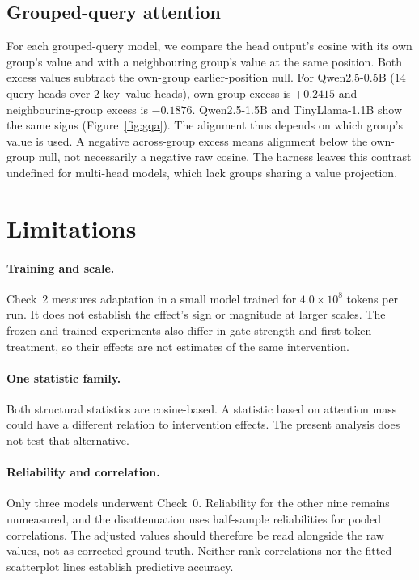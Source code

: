 \documentclass{article} %
\begin{document}
\subsection{Grouped-query attention}
\label{sec:gqa}

For each grouped-query model, we compare the head output's cosine with its
own group's value and with a neighbouring group's value at the same position.
Both excess values subtract the own-group earlier-position null. For
Qwen2.5-0.5B ($14$ query heads over $2$ key--value heads), own-group excess
is $+0.2415$ and neighbouring-group excess is $-0.1876$. Qwen2.5-1.5B
and TinyLlama-1.1B show the same signs (Figure~\ref{fig:gqa}). The
alignment thus depends on which group's value is used. A negative
across-group excess means alignment below the own-group null, not
necessarily a negative raw cosine. The harness leaves this contrast
undefined for multi-head models, which lack groups sharing a value
projection.

\section{Limitations}

\paragraph{Training and scale.} Check~2 measures adaptation in a small model
trained for $4.0\times10^{8}$ tokens per run. It does not establish the
effect's sign or magnitude at larger scales. The frozen and trained
experiments also differ in gate strength and first-token treatment, so their
effects are not estimates of the same intervention.

\paragraph{One statistic family.} Both structural statistics are cosine-based.
A statistic based on attention mass could have a different relation to
intervention effects. The present analysis does not test that alternative.

\paragraph{Reliability and correlation.} Only three models underwent
Check~0. Reliability for the other nine remains unmeasured, and the
disattenuation uses half-sample reliabilities for pooled correlations.
The adjusted values should therefore be read alongside the raw values,
not as corrected ground truth. Neither rank correlations nor the fitted
scatterplot lines establish predictive accuracy.
\end{document}

